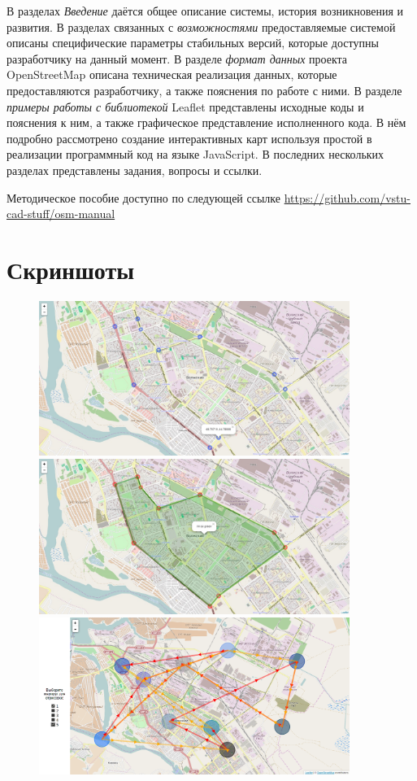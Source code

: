 \documentclass[a4paper, 14pt]{extreport}
\begin{document}
    В разделах \emph{Введение} даётся общее описание системы, история возникновения и развития. В разделах 
    связанных с \emph{возможностями} предоставляемые системой описаны специфические параметры стабильных 
    версий, которые доступны разработчику на данный момент. В разделе \emph{формат данных} проекта 
    OpenStreetMap описана техническая реализация данных, которые предоставляются разработчику, а также 
    пояснения по работе с ними. В разделе \emph{примеры работы с библиотекой} Leaflet представлены исходные 
    коды и пояснения к ним, а также графическое представление исполненного кода. В нём подробно рассмотрено 
    создание интерактивных карт используя простой в реализации программный код на языке JavaScript. 
    В последних нескольких разделах представлены задания, вопросы и ссылки.

    Методическое пособие доступно по следующей ссылке \url{https://github.com/vstu-cad-stuff/osm-manual}

    \chapter{Скриншоты}
    \begin{figure}[ht!]
        \center
        \includegraphics[width=0.9\textwidth]{e1}
        \includegraphics[width=0.9\textwidth]{e2}
        \includegraphics[width=0.9\textwidth]{e3}
    \end{figure}
\end{document}
